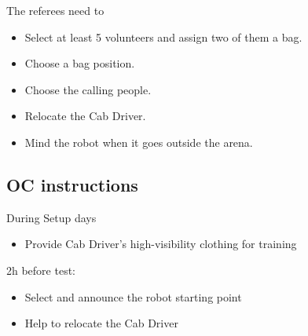 The referees need to
\begin{itemize}
	\item Select at least 5 volunteers and assign two of them a bag.
	\item Choose a bag position.
	\item Choose the calling people.
	\item Relocate the Cab Driver.
	\item Mind the robot when it goes outside the arena.
\end{itemize}

\subsection{OC instructions}
During Setup days
\begin{itemize}
	\item Provide Cab Driver's high-visibility clothing for training
\end{itemize}

2h before test:
\begin{itemize}
	\item Select and announce the robot starting point
	\item Help to relocate the Cab Driver
\end{itemize}

% 
